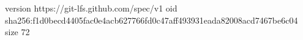 version https://git-lfs.github.com/spec/v1
oid sha256:f1d0becd4405fac0e4acb627766fd0c47aff493931eada82008acd7467be6c04
size 72
